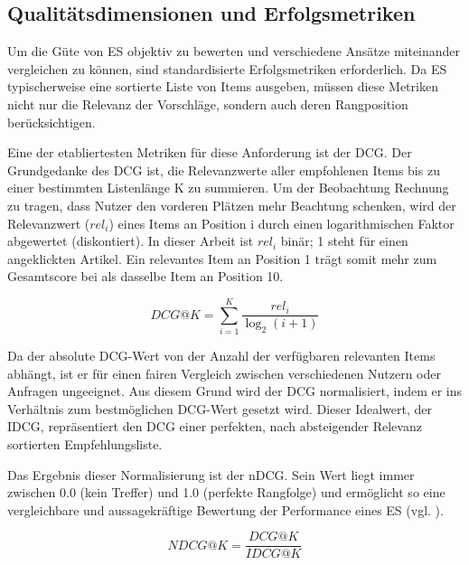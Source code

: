 \subsection{Qualitätsdimensionen und Erfolgsmetriken}
Um die Güte von \ac{ES} objektiv zu bewerten und verschiedene 
Ansätze miteinander vergleichen zu können, sind standardisierte 
Erfolgsmetriken erforderlich. Da \ac{ES} typischerweise eine sortierte 
Liste von Items ausgeben, müssen diese Metriken nicht nur die Relevanz der 
Vorschläge, sondern auch deren Rangposition berücksichtigen.

Eine der etabliertesten Metriken für diese Anforderung ist der \ac{DCG}. 
Der Grundgedanke des \ac{DCG} ist, 
die Relevanzwerte aller empfohlenen Items bis zu einer bestimmten Listenlänge 
K zu summieren. Um der Beobachtung Rechnung zu tragen, dass Nutzer den vorderen 
Plätzen mehr Beachtung schenken, wird der Relevanzwert (\(rel_{i}\)) eines Items an 
Position i durch einen logarithmischen Faktor abgewertet (diskontiert).
In dieser Arbeit ist \(rel_{i}\) binär; 1 steht für einen angeklickten Artikel.
Ein relevantes Item an Position 1 trägt somit mehr zum Gesamtscore bei als
dasselbe Item an Position 10.

\begin{equation}
\label{eq:dcg}
DCG@K=\sum_{i=1}^{K}\frac{rel_{i}}{\log_2(i+1)}
\end{equation}

Da der absolute \ac{DCG}-Wert von der Anzahl der verfügbaren relevanten 
Items abhängt, ist er für einen fairen Vergleich zwischen verschiedenen Nutzern 
oder Anfragen ungeeignet. Aus diesem Grund wird der \ac{DCG} normalisiert, 
indem er ins Verhältnis zum bestmöglichen \ac{DCG}-Wert gesetzt wird. Dieser 
Idealwert, der \ac{IDCG}, repräsentiert den \ac{DCG} einer perfekten,
 nach absteigender Relevanz sortierten Empfehlungsliste.

Das Ergebnis dieser Normalisierung ist der \ac{nDCG}. Sein Wert liegt immer zwischen 0.0 
(kein Treffer) und 1.0 (perfekte Rangfolge) und ermöglicht so eine 
vergleichbare und aussagekräftige Bewertung der Performance eines \ac{ES} 
(vgl. \cite{Jarvelin_ndcg_2002}).

\begin{equation}
\label{eq:ndcg}
NDCG@K=\frac{DCG@K}{IDCG@K}
\end{equation}


